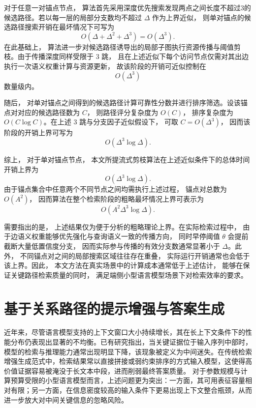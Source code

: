 \documentclass[promaster, vlined]{DissertUESTC}
\begin{document}
对于任意一对锚点节点， 算法首先采用深度优先搜索发现两点之间长度不超过3的候选路径。若以每一层的局部分支数均不超过 $\Delta$ 作为上界近似， 则单对锚点的候选路径搜索开销在最坏情况下可写为
\begin{equation}
O(\Delta+\Delta^2+\Delta^3)=O(\Delta^3).
\end{equation}
在此基础上， 算法进一步对候选路径诱导出的局部子图执行资源传播与阈值剪枝。由于传播深度同样受限于 3 跳， 且在上述近似下每个访问节点仅需对其出边执行一次语义权重计算与资源更新， 故该阶段的开销可近似控制在
\begin{equation}
O(\Delta^3)
\end{equation}
数量级内。

随后， 对单对锚点之间得到的候选路径计算可靠性分数并进行排序筛选。设该锚点对对应的候选路径数为 $C$， 则路径评分复杂度为 $O(C)$， 排序复杂度为 $O(C\log C)$。在上述 3 跳与分支因子近似假设下， 可取 $C=O(\Delta^3)$， 因而该阶段的开销上界可写为
\begin{equation}
O(\Delta^3\log\Delta).
\end{equation}

综上， 对于单对锚点节点， 本文所提流式剪枝算法在上述近似条件下的总体时间开销上界为
\begin{equation}
O(\Delta^3\log\Delta).
\end{equation}
由于锚点集合中任意两个不同节点之间均需执行上述过程， 锚点对总数为 $O(A^2)$， 因而算法在整个检索阶段的粗略最坏情况上界可表示为
\begin{equation}
O(A^2\Delta^3\log\Delta).
\end{equation}

需要指出的是， 上述结果仅为便于分析的粗略理论上界。在实际检索过程中， 由于边语义权重能够优先强化与查询语义一致的传播方向， 同时早停阈值 $\theta$ 会提前截断大量低置信度分支， 因而实际参与传播的有效分支数通常显著小于 $\Delta$。此外， 不同锚点对之间的局部搜索区域往往存在重叠， 实际运行开销通常也会低于该上界。因此， 本文方法在真实场景中的计算成本通常低于上述估计， 能够在保证关键路径检索质量的同时， 满足端侧小型语言模型场景下对检索效率的要求。


\section{基于关系路径的提示增强与答案生成}
近年来，尽管语言模型支持的上下文窗口大小持续增长，其在长上下文条件下的性能分布仍表现出显著的不均衡\cite{yu2024defense}。已有研究指出，当关键证据位于输入序列中部时，模型的检索与推理能力通常出现明显下降，该现象被定义为中间迷失\cite{liu2024lost,du2025context}。在传统检索增强生成范式中，检索结果常以直接拼接或弱约束排序的方式输入模型，这使得高价值证据容易被淹没于长文本中段，进而削弱最终答案质量。
对于参数规模与计算预算受限的小型语言模型而言，上述问题更为突出：一方面，其可用表征容量相对有限；另一方面，在信息密度较高的输入条件下更易出现上下文整合瓶颈，从而进一步放大对中间关键信息的忽略风险。
\end{document}
